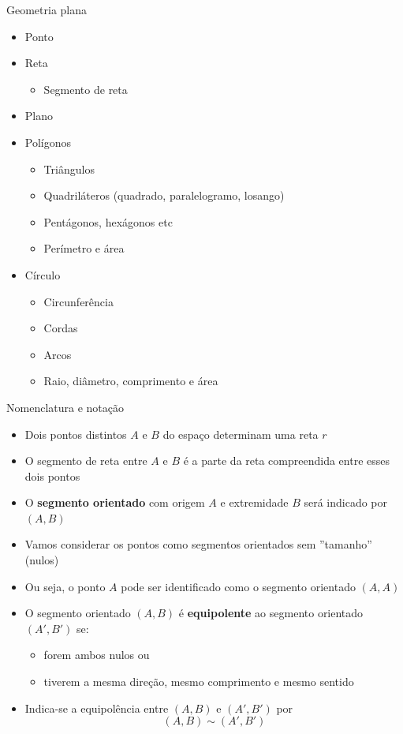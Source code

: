 \begin{frame}{Geometria plana}
    \begin{itemize}
        \item Ponto
        \item Reta        
            \begin{itemize}
                \item Segmento de reta
            \end{itemize}
        \item Plano
        \item Polígonos 
            \begin{itemize}
                \item Triângulos
                \item Quadriláteros (quadrado, paralelogramo, losango)
                \item Pentágonos, hexágonos etc 
                \item<2> Perímetro e área
            \end{itemize}
        \item Círculo
            \begin{itemize}
                \item Circunferência
                \item Cordas
                \item Arcos
                \item<2> Raio, diâmetro, comprimento e área
            \end{itemize}
    \end{itemize}
\end{frame}

\begin{frame}{Nomenclatura e notação}
    \begin{itemize}[<+->]
        \item Dois pontos distintos \(A\) e \(B\) do espaço determinam uma reta \(r\) 
        \item O segmento de reta entre \(A\) e \(B\) é a parte da reta compreendida entre esses dois pontos
        \item O \textbf{segmento orientado} com origem \(A\) e extremidade \(B\) será indicado por \((A,B)\)
        \item Vamos considerar os pontos como segmentos orientados sem ''tamanho'' (nulos)
        \item Ou seja, o ponto \(A\) pode ser identificado como o segmento orientado \((A,A)\)
        \item O segmento orientado \((A,B)\) é \textbf{equipolente} ao segmento orientado \((A',B')\) se:
            \begin{itemize}[<.->]
                \item forem ambos nulos ou
                \item tiverem a mesma direção, mesmo comprimento e mesmo sentido
            \end{itemize}
        \item Indica-se a equipolência entre \((A,B)\) e \((A',B')\) por 
            \[
                (A,B) \sim (A',B')
            \]
    \end{itemize}
\end{frame}

